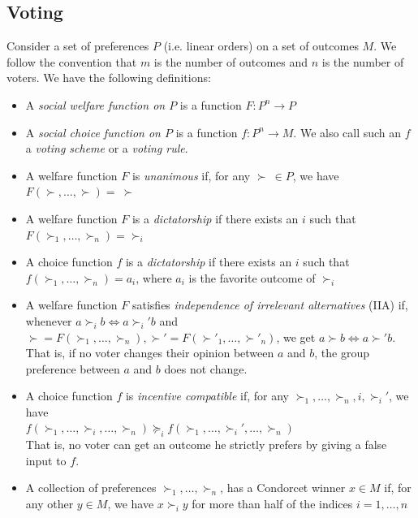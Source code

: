 \documentclass[12pt]{article}
\newcommand{\1}[1]{\mathds{1}[{#1}]}
\begin{document}
  \subsection{Voting}
    Consider a set of preferences $P$ (i.e. linear orders) on a
    set of outcomes $M$.
    We follow the convention that $m$ is the number of outcomes and $n$
    is the number of voters.
    We have the following definitions:
    \begin{itemize}
      \item A \emph{social welfare function on $P$}
        is a function $F : P^n \to P$
      \item A \emph{social choice function on $P$}
        is a function $f : P^n \to M$. We also call such an $f$ a 
        \emph{voting scheme} or a \emph{voting rule}.
      \item A welfare function $F$ is \emph{unanimous} if,
        for any $\succ\ \in P$, we have $F(\succ,\ldots,\succ) =\ \succ$
      \item A welfare function $F$ is a \emph{dictatorship} if
        there exists an $i$ such that $F(\succ_1,\ldots,\succ_n) = \succ_i$
      \item A choice function $f$ is a \emph{dictatorship} if
        there exists an $i$ such that $f(\succ_1,\ldots,\succ_n) = a_i$,
        where $a_i$ is the favorite outcome of $\succ_i$
      \item A welfare function $F$ satisfies \emph{independence of
        irrelevant alternatives} (IIA) if, whenever $a\succ_i b \iff a\succ_i' b$
        and $\succ = F(\succ_1,\ldots,\succ_n),
        \succ' = F(\succ'_1,\ldots,\succ'_n)$,
        we get $a\succ b \iff a\succ' b$. \\
        That is, if no voter changes their opinion between $a$ and $b$,
        the group preference between $a$ and $b$ does not change.
      \item A choice function $f$ is \emph{incentive compatible} if,
        for any $\succ_1,\ldots,\succ_n, i, \succ_i'$, we have \\
        $f(\succ_1,\ldots,\succ_i,\ldots,\succ_n) 
        \succeq_i f(\succ_1,\ldots,\succ_i',\ldots,\succ_n)$ \\
        That is, no voter can get an outcome he strictly prefers by giving a
        false input to $f$.
      \item A collection of preferences $\succ_1,\ldots,\succ_n$,
        has a Condorcet winner $x \in M$ if, for any other $y\in M$,
        we have $x \succ_i y$ for more than half of the indices
        $i=1,\ldots,n$
    \end{itemize}
\end{document}

